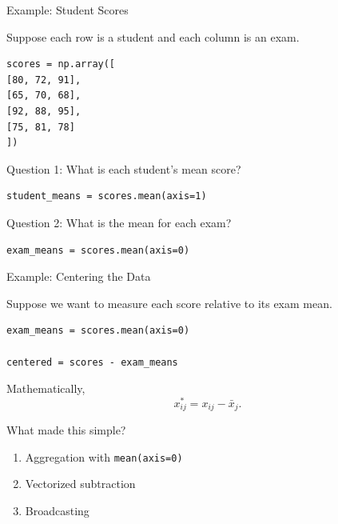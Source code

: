 \documentclass[11pt,aspectratio=43]{beamer}
\begin{document}
\begin{frame}[fragile]{Example: Student Scores}

Suppose each row is a student and each column is an exam.

\begin{lstlisting}
scores = np.array([
[80, 72, 91],
[65, 70, 68],
[92, 88, 95],
[75, 81, 78]
])
\end{lstlisting}

Question 1: What is each student's mean score?

\begin{lstlisting}
student_means = scores.mean(axis=1)
\end{lstlisting}

Question 2: What is the mean for each exam?

\begin{lstlisting}
exam_means = scores.mean(axis=0)
\end{lstlisting}

\end{frame}

\begin{frame}[fragile]{Example: Centering the Data}

Suppose we want to measure each score relative to its exam mean.

\begin{lstlisting}
exam_means = scores.mean(axis=0)

centered = scores - exam_means
\end{lstlisting}

Mathematically,
\[
x_{ij}^{*} = x_{ij} - \bar{x}_{j}.
\]

What made this simple?
\begin{enumerate}
\item Aggregation with \texttt{mean(axis=0)}
\item Vectorized subtraction
\item Broadcasting
\end{enumerate}

\end{frame}
\end{document}
